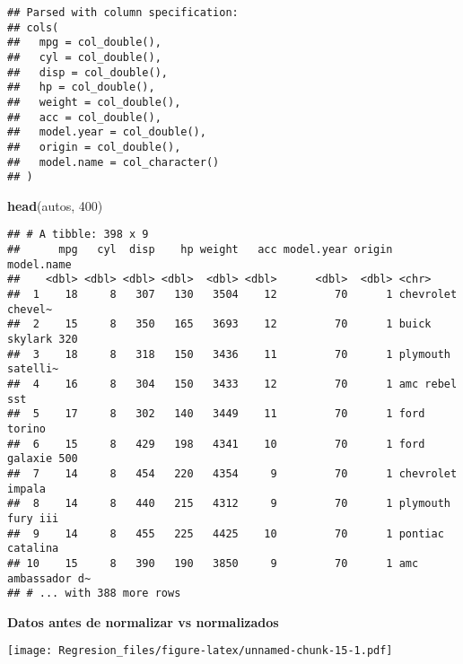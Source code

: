 \documentclass[]{article}
\newenvironment{Shaded}{\begin{snugshade}}{\end{snugshade}}
\newcommand{\DecValTok}[1]{\textcolor[rgb]{0.00,0.00,0.81}{#1}}
\newcommand{\KeywordTok}[1]{\textcolor[rgb]{0.13,0.29,0.53}{\textbf{#1}}}
\newcommand{\NormalTok}[1]{#1}
\newcommand{\OperatorTok}[1]{\textcolor[rgb]{0.81,0.36,0.00}{\textbf{#1}}}
\begin{document}
\begin{verbatim}
## Parsed with column specification:
## cols(
##   mpg = col_double(),
##   cyl = col_double(),
##   disp = col_double(),
##   hp = col_double(),
##   weight = col_double(),
##   acc = col_double(),
##   model.year = col_double(),
##   origin = col_double(),
##   model.name = col_character()
## )
\end{verbatim}

\begin{Shaded}
\begin{Highlighting}[]
\KeywordTok{head}\NormalTok{(autos, }\DecValTok{400}\NormalTok{)}
\end{Highlighting}
\end{Shaded}

\begin{verbatim}
## # A tibble: 398 x 9
##      mpg   cyl  disp    hp weight   acc model.year origin model.name       
##    <dbl> <dbl> <dbl> <dbl>  <dbl> <dbl>      <dbl>  <dbl> <chr>            
##  1    18     8   307   130   3504    12         70      1 chevrolet chevel~
##  2    15     8   350   165   3693    12         70      1 buick skylark 320
##  3    18     8   318   150   3436    11         70      1 plymouth satelli~
##  4    16     8   304   150   3433    12         70      1 amc rebel sst    
##  5    17     8   302   140   3449    11         70      1 ford torino      
##  6    15     8   429   198   4341    10         70      1 ford galaxie 500 
##  7    14     8   454   220   4354     9         70      1 chevrolet impala 
##  8    14     8   440   215   4312     9         70      1 plymouth fury iii
##  9    14     8   455   225   4425    10         70      1 pontiac catalina 
## 10    15     8   390   190   3850     9         70      1 amc ambassador d~
## # ... with 388 more rows
\end{verbatim}

\textbf{Datos antes de normalizar vs normalizados}

\begin{Shaded}
\end{Shaded}

\texttt{[image: Regresion\_files/figure-latex/unnamed-chunk-15-1.pdf]}

\begin{Shaded}
\end{Shaded}
\end{document}
